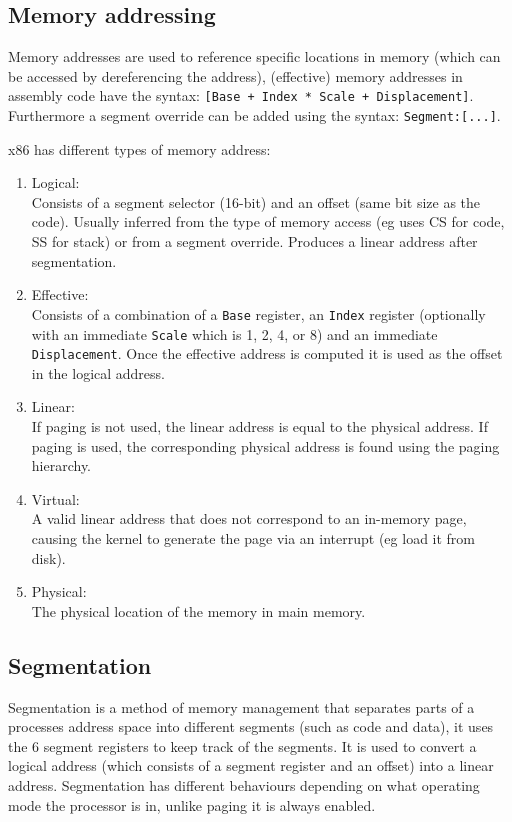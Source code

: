 \documentclass{article}
\newcommand{\layout}[1]{\parbox{\linewidth}{#1}}
\begin{document}
\layout{
  \subsection{Memory addressing}

  Memory addresses are used to reference specific locations in memory (which can be accessed by dereferencing the address), (effective) memory addresses in assembly code have the syntax: \texttt{[Base + Index * Scale + Displacement]}.
  Furthermore a segment override can be added using the syntax: \texttt{Segment:[...]}.
} \bigskip

\layout{
  x86 has different types of memory address:
  \begin{enumerate}
    \item Logical: \\
      Consists of a segment selector (16-bit) and an offset (same bit size as the code).
      Usually inferred from the type of memory access (eg uses CS for code, SS for stack) or from a segment override.
      Produces a linear address after segmentation.
    \item Effective: \\
      Consists of a combination of a \texttt{Base} register, an \texttt{Index} register (optionally with an immediate \texttt{Scale} which is 1, 2, 4, or 8) and an immediate \texttt{Displacement}.
      Once the effective address is computed it is used as the offset in the logical address.
    \item Linear: \\
      If paging is not used, the linear address is equal to the physical address.
      If paging is used, the corresponding physical address is found using the paging hierarchy.
    \item Virtual: \\
      A valid linear address that does not correspond to an in-memory page, causing the kernel to generate the page via an interrupt (eg load it from disk).
    \item Physical: \\
      The physical location of the memory in main memory.
  \end{enumerate}
}


\layout{
  \subsection{Segmentation}

  Segmentation is a method of memory management that separates parts of a processes address space into different segments (such as code and data), it uses the 6 segment registers to keep track of the segments.
  It is used to convert a logical address (which consists of a segment register and an offset) into a linear address.
  Segmentation has different behaviours depending on what operating mode the processor is in, unlike paging it is always enabled.

  \bigskip \cite[Chapter~3.1]{sdm3}
}
\end{document}
